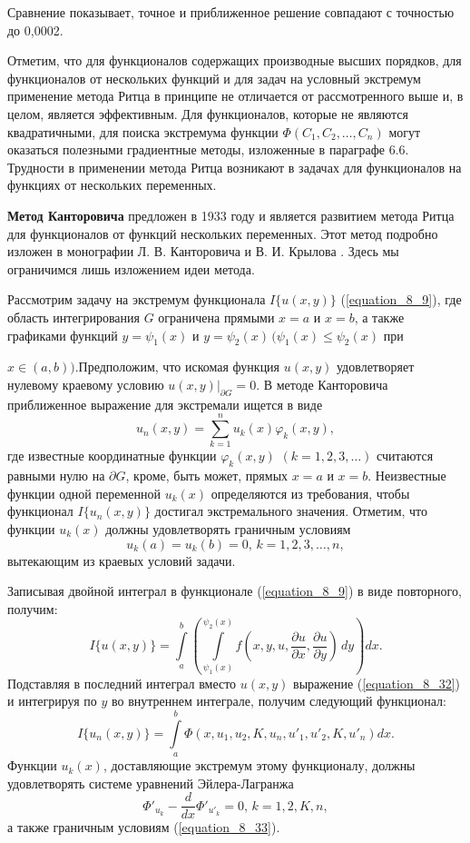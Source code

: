 {	Сравнение показывает, точное и приближенное решение совпадают с точностью до 0,0002.

	Отметим, что для функционалов содержащих производные высших порядков, для функционалов от нескольких функций и для задач на условный экстремум применение метода Ритца в принципе не отличается от рассмотренного выше и, в целом, является эффективным. Для функционалов, которые не являются квадратичными, для поиска экстремума функции $\Phi(C_1,C_2,\dots,C_n)$ могут оказаться полезными градиентные методы, изложенные в параграфе 6.6. Трудности в применении метода Ритца возникают в задачах для функционалов на функциях от нескольких переменных. }

	{\bf Метод Канторовича} предложен в 1933 году и является развитием метода Ритца для функционалов от функций нескольких переменных. Этот метод подробно изложен в монографии Л. В. Канторовича и В. И. Крылова \cite{literature_kantorovich}. Здесь мы ограничимся лишь изложением идеи метода.

	Рассмотрим задачу на экстремум функционала $I\{u(x,y)\}$ (\ref{equation_8_9}), где область интегрирования $G$ ограничена прямыми $x=a$ и $x=b$, а также графиками функций $y=\psi_1(x)$ и $y=\psi_2(x)\,(\psi_1(x)\le \psi_2(x)$ при

	\newpage
	 \noindent
	$x\in (a,b))$.Предположим, что искомая функция $u(x,y)$ удовлетворяет нулевому краевому условию $u(x,y)|_{\partial G}=0$. В методе Канторовича приближенное выражение для экстремали ищется в виде
	\begin{equation}
	\label{equation_8_32}
		\textstyle u_n(x,y)=\sum\limits^n_{k=1} u_k(x)\varphi_k (x,y),
	\end{equation}
	где известные координатные функции $\varphi_k(x,y)$ $(k=1, 2, 3,\dots)$ считаются равными нулю на $\partial G$, кроме, быть может, прямых $x=a$ и $x=b$. Неизвестные функции одной переменной $u_k(x)$ определяются из требования, чтобы функционал $I\{u_n(x,y)\}$ достигал экстремального значения. Отметим, что функции $u_k(x)$ должны удовлетворять граничным условиям
	\begin{equation}
	\label{equation_8_33}
		 u_k(a)=u_k(b)=0,\,k=1,2,3,\dots ,n,
	\end{equation}
	вытекающим из краевых условий задачи.

	Записывая двойной интеграл в функционале (\ref{equation_8_9}) в виде повторного, получим:
	$$\textstyle I\{u(x,y)\}=\int\limits^b_a (\int\limits^{\psi_2(x)}_{\psi_1(x)} f(x,y,u,{\displaystyle \frac{\partial u}{\partial x}},{\displaystyle \frac{\partial u}{\partial y}})\,dy)dx.$$
	Подставляя в последний интеграл вместо $u(x,y)$	выражение (\ref{equation_8_32}) и интегрируя по $y$ во внутреннем интеграле, получим следующий функционал:
	$$\textstyle I\{u_n(x,y)\}=\int\limits^b_a \Phi (x,u_1,u_2,K,u_n,u'_1,u'_2,K,u'_n)dx.$$
	Функции $u_k(x)$, доставляющие экстремум этому функционалу, должны удовлетворять системе уравнений Эйлера-Лагранжа
	\begin{equation}
	\label{equation_8_34}
		\Phi'_{u_k}-{\displaystyle \frac{d}{dx}}\Phi'_{u'_k}=0,\,k=1,2,K,n,
	\end{equation}
	а также граничным условиям (\ref{equation_8_33}).

